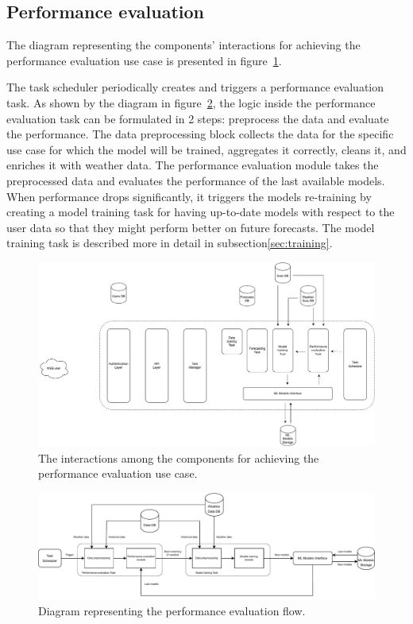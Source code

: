 \vspace{0.1 cm}
\subsection{Performance evaluation}
\label{sec:scheduler}
\vspace{0.1 cm}

The diagram representing the components' interactions for achieving the performance evaluation use case is presented in figure~\ref{fig:schedulerinteractions}.

The task scheduler periodically creates and triggers a performance evaluation task.
As shown by the diagram in figure~\ref{fig:schedulerflow}, the logic inside the performance evaluation task can be formulated in 2 steps: preprocess the data and evaluate the performance.
The data preprocessing block collects the data for the specific use case for which the model will be trained, aggregates it correctly, cleans it, and enriches it with weather data.
The performance evaluation module takes the preprocessed data and evaluates the performance of the last available models.
When performance drops significantly, it triggers the models re-training by creating a model training task for having up-to-date models with respect to the user data so that they might perform better on future forecasts.
The model training task is described more in detail in subsection\ref{sec:training}.

\begin{figure}[H]
\centering
\includegraphics[width=1\textwidth]{images/architecture_scheduler_interactions}
\caption{The interactions among the components for achieving the performance evaluation use case.}
\label{fig:schedulerinteractions}
\end{figure}

\begin{figure}[H]
\centering
\includegraphics[width=1\textwidth]{images/architecture_scheduler_flow}
\caption{Diagram representing the performance evaluation flow.}
\label{fig:schedulerflow}
\end{figure}

